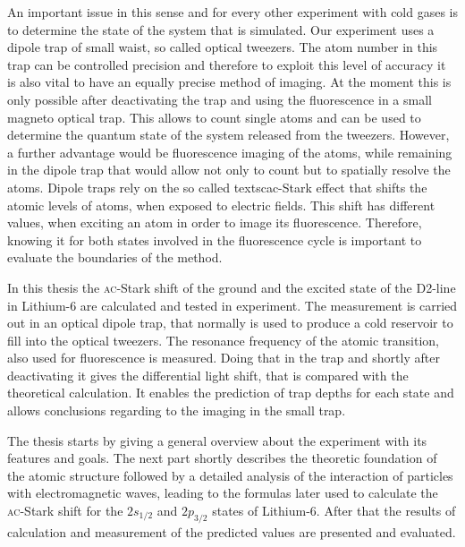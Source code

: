 An important issue in this sense and for every other experiment with cold gases is to determine the state of the system that is simulated. Our experiment uses a dipole trap of small waist, so called optical tweezers. The atom number in this trap can be controlled precision and therefore to exploit this level of accuracy it is also vital to have an equally precise method of imaging. At the moment this is only possible after deactivating the trap and using the fluorescence in a small magneto optical trap. This allows to count single atoms and can be used to determine the quantum state of the system released from the tweezers. However, a further advantage would be fluorescence imaging of the atoms, while remaining in the dipole trap that would allow not only to count but to spatially resolve the atoms. Dipole traps rely on the so called textsc{ac}-Stark effect that shifts the atomic levels of atoms, when exposed to electric fields. This shift has different values, when exciting an atom in order to image its fluorescence. Therefore, knowing it for both states involved in the fluorescence cycle is important to evaluate the boundaries of the method.

In this thesis the \textsc{ac}-Stark shift of the ground and the excited state of the D2-line in Lithium-6 are calculated and tested in experiment. The measurement is carried out in an optical dipole trap, that normally is used to produce a cold reservoir to fill into the optical tweezers. The resonance frequency of the atomic transition, also used for fluorescence is measured. Doing that in the trap and shortly after deactivating it gives the differential light shift, that is compared with the theoretical calculation. It enables the prediction of trap depths for each state and allows conclusions regarding to the imaging in the small trap. 

The thesis starts by giving a general overview about the experiment with its features and goals. The next part shortly describes the theoretic foundation of the atomic structure followed by a detailed analysis of the interaction of particles with electromagnetic waves, leading to the formulas later used to calculate the \textsc{ac}-Stark shift for the $2s_{1/2}$ and $2p_{3/2}$ states of Lithium-6. After that the results of calculation and measurement of the predicted values are presented and evaluated.

